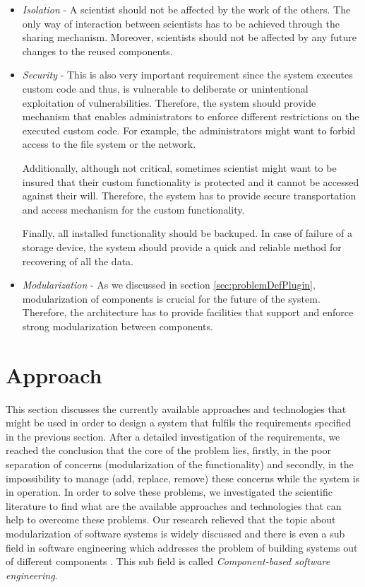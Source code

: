 \begin{itemize}
	
	\item \textit{Isolation} - A scientist should not be affected by the work of the others. The only way of interaction between scientists has to be achieved through the sharing mechanism. Moreover, scientists should not be affected by any future changes to the reused components.
		
	\item \textit{Security} - This is also very important requirement since the system executes custom code and thus, is vulnerable to deliberate or unintentional exploitation of vulnerabilities. Therefore, the system should provide mechanism that enables administrators to enforce different restrictions on the executed custom code. For example, the administrators might want to forbid access to the file system or the network.
	
	Additionally, although not critical, sometimes scientist might want to be insured that their custom functionality is protected and it cannot be accessed against their will. Therefore, the system has to provide secure transportation and access mechanism for the custom functionality.
	
	Finally, all installed functionality should be backuped. In case of failure of a storage device, the system should provide a quick and reliable method for recovering of all the data.
	
	\item \textit{Modularization} - As we discussed in section \ref{sec:problemDefPlugin}, modularization of components is crucial for the future of the system. Therefore, the architecture has to provide facilities that support and enforce strong modularization between components.
	
\end{itemize}

\section{Approach}
\label{sec:approachPlugin}

This section discusses the currently available approaches and technologies that might be used in order to design a system that fulfils the requirements specified in the previous section. After a detailed investigation of the requirements, we reached the conclusion that the core of the problem lies, firstly, in the poor separation of concerns (modularization of the functionality) and secondly, in the impossibility to manage (add, replace, remove) these concerns while the system is in operation. In order to solve these problems, we investigated the scientific literature to find what are the available approaches and technologies that can help to overcome these problems. Our research relieved that the topic about modularization of software systems is widely discussed and there is even a sub field in software engineering which addresses the problem of building systems out of different components \cite{Jifeng}. This sub field is called \textit{Component-based software engineering}. 

